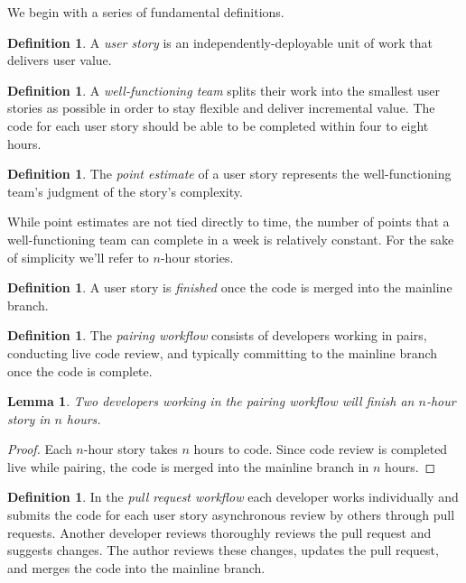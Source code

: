 \documentclass[letterpaper]{article}
\newtheorem{lemma}[theorem]{Lemma}
\theoremstyle{definition}
\newtheorem{definition}[theorem]{Definition}
\begin{document}
    We begin with a series of fundamental definitions.

    \begin{definition}
        A \textit{user story} is an independently-deployable unit of work that delivers user value.
    \end{definition}

    \begin{definition}
        A \textit{well-functioning team} splits their work into the smallest user stories as possible in order to stay
        flexible and deliver incremental value.
        The code for each user story should be able to be completed within four to eight hours.
    \end{definition}

    \begin{definition}
        The \textit{point estimate} of a user story represents the well-functioning team's judgment of the story's
        complexity.
    \end{definition}

    While point estimates are not tied directly to time, the number of points that a well-functioning team can complete
    in a week is relatively constant.
    For the sake of simplicity we'll refer to $n$-hour stories.

    \begin{definition}
        A user story is \textit{finished} once the code is merged into the mainline branch.
    \end{definition}

    \begin{definition}
        The \textit{pairing workflow} consists of developers working in pairs, conducting live code review, and
        typically committing to the mainline branch once the code is complete.
    \end{definition}

    \begin{lemma}\label{lemma:pair}
        Two developers working in the pairing workflow will finish an $n$-hour story in $n$ hours.
    \end{lemma}
    \begin{proof}
        Each $n$-hour story takes $n$ hours to code.
        Since code review is completed live while pairing, the code is merged into the mainline branch in $n$ hours.
    \end{proof}

    \begin{definition}
        In the \textit{pull request workflow} each developer works individually and submits the code for each user story
        asynchronous review by others through pull requests.
        Another developer reviews thoroughly reviews the pull request and suggests changes.
        The author reviews these changes, updates the pull request, and merges the code into the mainline branch.
    \end{definition}
\end{document}
